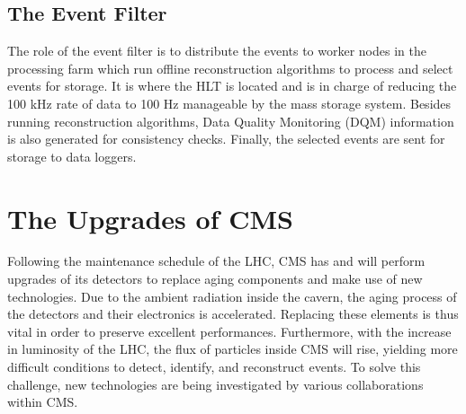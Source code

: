     \subsection{The Event Filter}

      The role of the event filter is to distribute the events to worker nodes in the processing farm which run offline reconstruction algorithms to process and select events for storage. It is where the HLT is located and is in charge of reducing the 100 kHz rate of data to 100 Hz manageable by the mass storage system. Besides running reconstruction algorithms, Data Quality Monitoring (DQM) information is also generated for consistency checks. Finally, the selected events are sent for storage to data loggers.

  \section{The Upgrades of CMS}

    Following the maintenance schedule of the LHC, CMS has and will perform upgrades of its detectors to replace aging components and make use of new technologies. Due to the ambient radiation inside the cavern, the aging process of the detectors and their electronics is accelerated. Replacing these elements is thus vital in order to preserve excellent performances. Furthermore, with the increase in luminosity of the LHC, the flux of particles inside CMS will rise, yielding more difficult conditions to detect, identify, and reconstruct events. To solve this challenge, new technologies are being investigated by various collaborations within CMS.
